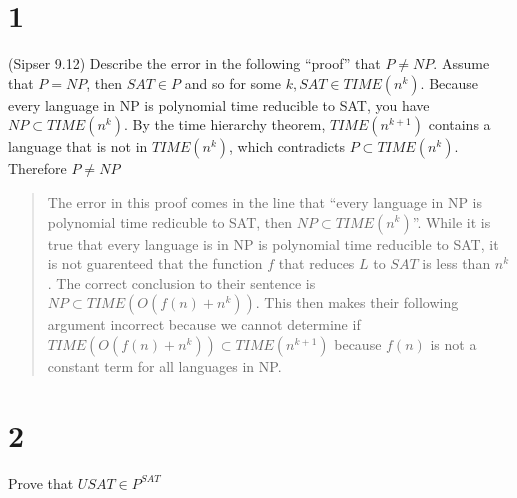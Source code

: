 \documentclass[
  letterpaper,
  DIV=11,
  numbers=noendperiod]{scrartcl}
\author{}
\date{}
\begin{document}
\section{1}\label{section}

(Sipser 9.12) Describe the error in the following ``proof'' that
\(P \neq NP\). Assume that \(P = NP\), then \(SAT \in P\) and so for
some \(k, SAT \in TIME(n^k)\). Because every language in NP is
polynomial time reducible to SAT, you have \(NP \subset TIME(n^k)\). By
the time hierarchy theorem, \(TIME(n^{k+1})\) contains a language that
is not in \(TIME(n^k)\), which contradicts \(P \subset TIME(n^k)\).
Therefore \(P\neq NP\)

\begin{quote}
The error in this proof comes in the line that ``every language in NP is
polynomial time redicuble to SAT, then \(NP\subset TIME(n^k)\)''. While
it is true that every language is in NP is polynomial time reducible to
SAT, it is not guarenteed that the function \(f\) that reduces \(L\) to
\(SAT\) is less than \(n^k\). The correct conclusion to their sentence
is \(NP \subset TIME(O(f(n) + n^k))\). This then makes their following
argument incorrect because we cannot determine if
\(TIME(O(f(n)+n^k)) \subset TIME(n^{k+1})\) because \(f(n)\) is not a
constant term for all languages in NP.
\end{quote}

\section{2}\label{section-1}

Prove that \(USAT \in P^{SAT}\)
\end{document}
